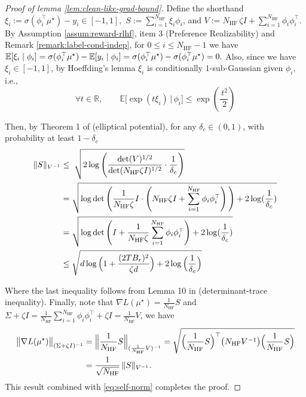 \documentclass[10pt]{article} %
\theoremstyle{plain}
\theoremstyle{definition}
\theoremstyle{remark}
\newcommand{\bE}{\mathbb{E}}
\newcommand{\bR}{\mathbb{R}}
\begin{document}
\begin{proof}[Proof of lemma \ref{lem:clean-like-grad-bound}]
Define the shorthand $\xi_i := \sigma(\phi_i^\top\mu^\star)-y_i \in [-1,1],$ $S:=\sum_{i=1}^{N_{\mathrm{HF}}}\xi_i\phi_i$, and $V := N_{\mathrm{HF}}\,\zeta I + \sum_{i=1}^{N_{\mathrm{HF}}}\phi_i\phi_i^\top$. By Assumption \ref{assum:reward-rlhf}, item $3$ (Preference Realizability) and Remark \ref{remark:label-cond-indep}, for $0\le i\le N_{\mathrm{HF}}-1$ we have \(\bE[\xi_i \mid \phi_i]=\sigma(\phi_i^\top \mu^\star) - \bE[y_i \mid \phi_i]\notag=\sigma(\phi_i^\top \mu^\star) - \sigma(\phi_i^\top \mu^\star)\notag=
0.\) Also, since we have $\xi_i\in[-1,1]$, by Hoeffding's lemma $\xi_i$ is conditionally $1$-sub-Gaussian given $\phi_i$, i.e.,
\[
\forall t\in\bR,\qquad \bE\big[\exp(t\xi_i)\,|\,\phi_i\big]\le\exp(\frac{\,t^2}{\,2})
\]


Then, by Theorem 1 of \citet{NIPS2011_e1d5be1c} (elliptical potential), for any $\delta_c\in(0,1)$, with probability at
least $1-\delta_c$
\begin{align}
\label{eq:self-norm}
\|S\|_{V^{-1}} &\le\; \sqrt{2\log \Bigg(\frac{\det(V)^{1/2}}{\det(N_{\mathrm{HF}}\zeta I)^{1/2}}\cdot\frac{1}{\delta_c}\Bigg)}\notag\\
&= \sqrt{\log\det\Bigg(\frac{1}{N_{\mathrm{HF}}\zeta }I \cdot \left( N_{\mathrm{HF}}\zeta I + \sum_{i=1}^{N_{\mathrm{HF}}}\phi_i\phi_i^\top \right)\Bigg)+2\log(\frac{1}{\delta_c})}\notag\\
&= \sqrt{\log\det\left( I + \frac{1}{N_{\mathrm{HF}}\zeta }\sum_{i=1}^{N_{\mathrm{HF}}}\phi_i\phi_i^\top \right)+2\log(\frac{1}{\delta_c})}\notag\\
&\le \sqrt{d\log \Big(1+\frac{(2T B_r)^2}{\zeta d}\Big)+2\log \Big(\frac{1}{\delta_c}\Big)}
\end{align}

Where the last inequality follows from Lemma 10 in \citet{NIPS2011_e1d5be1c} (determinant-trace inequality). Finally, note that $\nabla L(\mu^\star)=\frac{1}{N_{\mathrm{HF}}}S$ and \(
\Sigma+\zeta I
=\frac{1}{N_{\mathrm{HF}}}\sum_{i=1}^{N_{\mathrm{HF}}}\phi_i\phi_i^\top + \zeta I=\frac{1}{N_{\mathrm{HF}}}V
\), we have
\begin{align}
\bigl\|\nabla L(\mu^\star)\bigr\|_{(\Sigma+\zeta I)^{-1}}
&=\Bigl\|\frac{1}{N_{\mathrm{HF}}}S\Bigr\|_{(\frac{1}{N_{\mathrm{HF}}}V)^{-1}}=\sqrt{\Big(\frac{1}{N_{\mathrm{HF}}}S\Big)^\top \big(N_{\mathrm{HF}}V^{-1}\big)\Big(\frac{1}{N_{\mathrm{HF}}}S\Big)}\notag\\
&=\frac{1}{\sqrt{N_{\mathrm{HF}}}}\,\|S\|_{V^{-1}}.\label{eq:scaling_fix}
\end{align} This result combined with \ref{eq:self-norm} completes the proof.


 
\end{proof}
\end{document}
